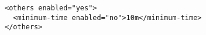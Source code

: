 \begin{verbatim}
<others enabled="yes">
  <minimum-time enabled="no">10m</minimum-time>
</others>
\end{verbatim}
